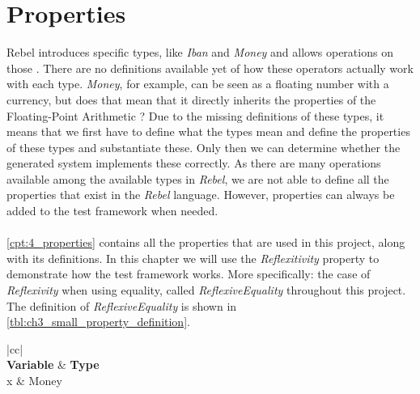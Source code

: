 \section{Properties}
Rebel introduces specific types, like \textit{Iban} and \textit{Money} and allows operations on those \cite{stoel2016solving}. There are no definitions available yet of how these operators actually work with each type. \textit{Money}, for example, can be seen as a floating number with a currency, but does that mean that it directly inherits the properties of the Floating-Point Arithmetic \cite{goldberg1991every}? Due to the missing definitions of these types, it means that we first have to define what the types mean and define the properties of these types and substantiate these. Only then we can determine whether the generated system implements these correctly. As there are many operations available among the available types in \textit{Rebel}, we are not able to define all the properties that exist in the \textit{Rebel} language. However, properties can always be added to the test framework when needed.\\
\\
\autoref{cpt:4_properties} contains all the properties that are used in this project, along with its definitions. In this chapter we will use the \textit{Reflexitivity} property to demonstrate how the test framework works. More specifically: the case of \textit{Reflexivity} when using equality, called \textit{ReflexiveEquality} throughout this project. The definition of \textit{ReflexiveEquality} is shown in \autoref{tbl:ch3_small_property_definition}.
\FloatBarrier
\begin{table}[h!]
\centering
\begin{tabular}{|cc|}
\hline
{} \\ \hline
\textbf{Variable} & \textbf{Type} \\ \hline
x & Money \\ \hline
\end{tabular}
\caption{A property definition of \textit{Reflexivity} when using equality}
\label{tbl:ch3_small_property_definition}
\end{table}
\FloatBarrier

